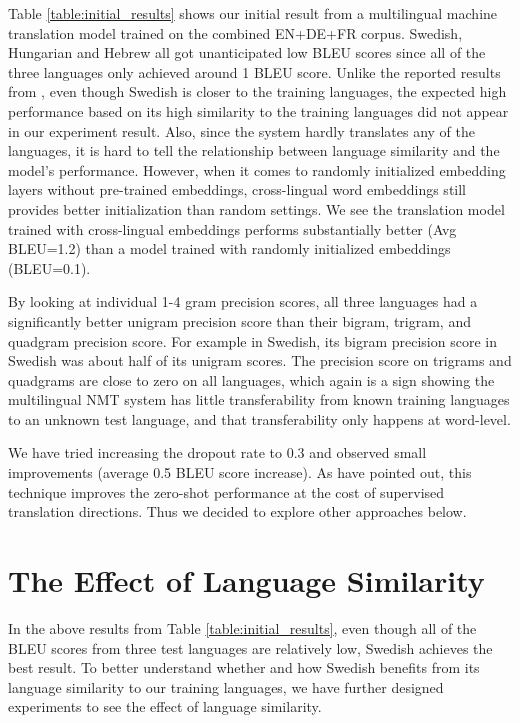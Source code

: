 \documentclass[thesis,fonts=libertine]{cluu}
\begin{document}
Table \ref{table:initial_results} shows our initial result from a multilingual machine translation model trained on the combined EN+DE+FR corpus. Swedish, Hungarian and Hebrew all got unanticipated low BLEU scores since all of the three languages only achieved around 1 BLEU score. Unlike the reported results from \textcite{Qi:2018aa}, even though Swedish is closer to the training languages, the expected high performance based on its high similarity to the training languages did not appear in our experiment result. Also, since the system hardly translates any of the languages, it is hard to tell the relationship between language similarity and the model's performance. However, when it comes to randomly initialized embedding layers without pre-trained embeddings, cross-lingual word embeddings still provides better initialization than random settings. We see the translation model trained with cross-lingual embeddings performs substantially better (Avg BLEU=1.2) than a model trained with randomly initialized embeddings (BLEU=0.1).

By looking at individual 1-4 gram precision scores, all three languages had a significantly better unigram precision score than their bigram, trigram, and quadgram precision score. For example in Swedish, its bigram precision score in Swedish was about half of its unigram scores. The precision score on trigrams and quadgrams are close to zero on all languages, which again is a sign showing the multilingual NMT system has little transferability from known training languages to an unknown test language, and that transferability only happens at word-level.

We have tried increasing the dropout rate to 0.3 and observed small improvements (average 0.5 BLEU score increase). As \textcite{Arivazhagan:2019aa} have pointed out, this technique improves the zero-shot performance at the cost of supervised translation directions. Thus we decided to explore other approaches below.

\section{The Effect of Language Similarity}
\label{sec:langauge_similarity}

In the above results from Table \ref{table:initial_results}, even though all of the BLEU scores from three test languages are relatively low, Swedish achieves the best result. To better understand whether and how Swedish benefits from its language similarity to our training languages, we have further designed experiments to see the effect of language similarity.
\end{document}
